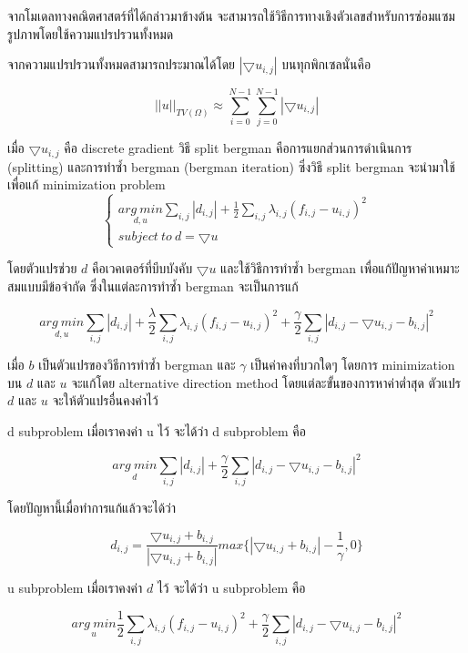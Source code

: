 \documentclass[hidelinks,a4paper,14pt]{article}
\numberwithin{equation}{section}							%
\begin{document}
{	จากโมเดลทางคณิตศาสตร์ที่ได้กล่าวมาข้างต้น จะสามารถใช้วิธีการทางเชิงตัวเลขสำหรับการซ่อมแซมรูปภาพโดยใช้ความแปรปรวนทั้งหมด
	
	จากความแปรปรวนทั้งหมดสามารถประมาณได้โดย $ |\bigtriangledown u_{i,j} | $ บนทุกพิกเซลนั่นคือ
	
	$$ ||u||_{TV(\Omega)} \approx \sum_{i=0}^{N-1} \sum_{j=0}^{N-1} |\bigtriangledown u_{i,j}| $$
	
	เมื่อ $\bigtriangledown u_{i,j}$  คือ discrete gradient วิธี split bergman คือการแยกส่วนการดำเนินการ (splitting) และการทำซ้ำ bergman (bergman iteration) ซึ่งวิธี split bergman จะนำมาใช้เพื่อแก้ minimization problem
	$$
	\left\{ \begin{array}{lc} 
		\underset{d , u}{arg \ min}\sum_{i,j}|d_{i,j}|+\frac{1}{2}\sum_{i,j}\lambda_{i,j}(f_{i,j} - u_{i,j})^2 \\
		subject \ to \ d = \bigtriangledown u 
	\end{array} \right .
	$$

	โดยตัวแปรช่วย $d$  คือเวคเตอร์ที่บีบบังคับ $ \bigtriangledown u$ และใช้วิธีการทำซ้ำ bergman เพื่อแก้ปัญหาค่าเหมาะสมแบบมีข้อจำกัด ซึ่งในแต่ละการทำซ้ำ bergman จะเป็นการแก้
	
	$$\underset{d , u}{arg \ min}\sum_{i,j}|d_{i,j}|+\frac{\lambda}{2}\sum_{i,j}\lambda_{i,j}(f_{i,j} - u_{i,j})^2 + \frac{\gamma}{2} \sum_{i,j} |d_{i,j} - \bigtriangledown u_{i,j}- b_{i,j}|^2 $$
	
	เมื่อ $b$  เป็นตัวแปรของวิธีการทำซ้ำ bergman และ $\gamma$ เป็นค่าคงที่บวกใดๆ โดยการ minimization  บน $d$ และ $u$  จะแก้โดย alternative direction method โดยแต่ละขั้นของการหาค่าต่ำสุด ตัวแปร $d$ และ $u$ จะให้ตัวแปรอื่นคงค่าไว้
	
	d subproblem เมื่อเราคงค่า u ไว้ จะได้ว่า d subproblem คือ
	
	$$ \underset{d}{arg \ min} \sum_{i,j} |d_{i,j}| + \frac{\gamma}{2} \sum_{i,j}|d_{i,j} - \bigtriangledown u_{i,j} - b_{i,j}|^2$$
	
	โดยปัญหานี้เมื่อทำการแก้แล้วจะได้ว่า 
	
	$$ d_{i,j} = \frac{\bigtriangledown u_{i,j}  + b_{i,j} }{ | \bigtriangledown u_{i,j}  + b_{i,j} | } max \{  | \bigtriangledown u_{i,j}  + b_{i,j} | - \frac{1}{\gamma} , 0\} $$
	
	u subproblem เมื่อเราคงค่า $d$ ไว้ จะได้ว่า u subproblem คือ
	
	$$ \underset{u}{arg \ min} \frac{1}{2} \sum_{i,j} \lambda_{i,j}  (f_{i,j} - u_{i,j})^2 + \frac{\gamma}{2} \sum_{i,j} |d_{i,j} - \bigtriangledown u_{i,j} - b_{i,j}|^2$$
	
}
\end{document}
